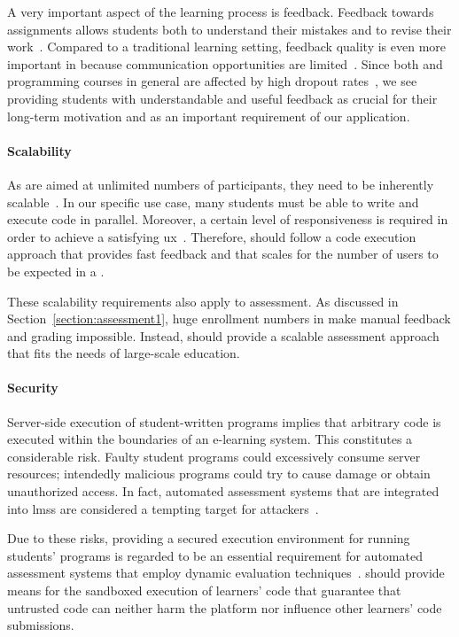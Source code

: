 A very important aspect of the learning process is feedback. Feedback towards assignments allows students both to understand their mistakes and to revise their work~\cite{malmi2002experiences}. Compared to a traditional learning setting, feedback quality is even more important in \moocs because communication opportunities are limited~\cite{pieterse2013automated}. Since both \moocs and programming courses in general are affected by high dropout rates~\cite{lahtinen2005study}, we see providing students with understandable and useful feedback as crucial for their long-term motivation and as an important requirement of our application.

\paragraph{Scalability}

As \moocs are aimed at unlimited numbers of participants, they need to be inherently scalable~\cite{vihavainen2012multi}. In our specific use case, many students must be able to write and execute code in parallel. Moreover, a certain level of responsiveness is required in order to achieve a satisfying \gls{ux}~\cite{ben2013moocs}. Therefore, \tool should follow a code execution approach that provides fast feedback and that scales for the number of users to be expected in a \mooc.

These scalability requirements also apply to assessment. As discussed in Section~\ref{section:assessment1}, huge enrollment numbers in \moocs make manual feedback and grading impossible. Instead, \tool should provide a scalable assessment approach that fits the needs of large-scale education.

\paragraph{Security}

Server-side execution of student-written programs implies that arbitrary code is executed within the boundaries of an e-learning system. This constitutes a considerable risk. Faulty student programs could excessively consume server resources; intendedly malicious programs could try to cause damage or obtain unauthorized access. In fact, automated assessment systems that are integrated into \glspl{lms} are considered a tempting target for attackers~\cite{ihantola2010review}.

Due to these risks, providing a secured execution environment for running students' programs is regarded to be an essential requirement for automated assessment systems that employ dynamic evaluation techniques~\cite{ala2005survey}. \tool should provide means for the sandboxed execution of learners' code that guarantee that untrusted code can neither harm the platform nor influence other learners' code submissions.

